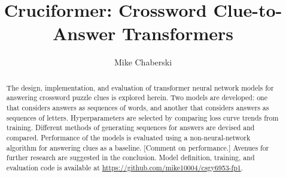 \documentclass[letterpaper]{article} %
\title{Cruciformer: Crossword Clue-to-Answer Transformers}
\author {
    Mike Chaberski
}
\begin{document}
\maketitle

\begin{abstract}
    The design, implementation, and evaluation of transformer neural network models for answering crossword puzzle clues is explored herein. Two models are developed: one that considers answers as sequences of words, and another that considers answers as sequences of letters. Hyperparameters are selected by comparing loss curve trends from training. Different methods of generating sequences for answers are devised and compared. Performance of the models is evaluated using a non-neural-network algorithm for answering clues as a baseline. [Comment on performance.] Avenues for further research are suggested in the conclusion.
    Model definition, training, and evaluation code is available at \url{https://github.com/mike10004/csgy6953-fp1}.
\end{abstract}
\end{document}
